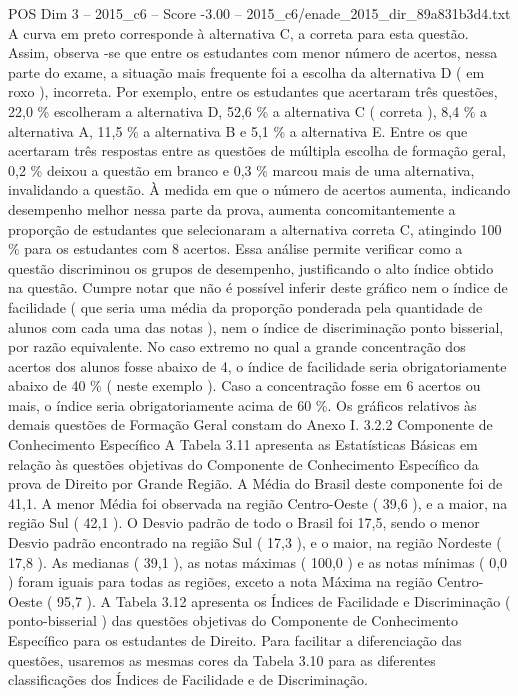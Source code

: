 \begin{textsample}{POS Dim 3 – 2015\_c6 – Score -3.00 – 2015\_c6/enade\_2015\_dir\_89a831b3d4.txt}
A curva em preto corresponde à alternativa C, a correta para esta questão.
Assim, observa -se que entre os estudantes com menor número de acertos, nessa parte do exame, a situação mais frequente foi a escolha da alternativa D ( em roxo ), incorreta.
Por exemplo, entre os estudantes que acertaram três questões, 22,0 \% escolheram a alternativa D, 52,6 \% a alternativa C ( correta ), 8,4 \% a alternativa A, 11,5 \% a alternativa B e 5,1 \% a alternativa E.
Entre os que acertaram três respostas entre as questões de múltipla escolha de formação geral, 0,2 \% deixou a questão em branco e 0,3 \% marcou mais de uma alternativa, invalidando a questão.
À medida em que o número de acertos aumenta, indicando desempenho melhor nessa parte da prova, aumenta concomitantemente a proporção de estudantes que selecionaram a alternativa correta C, atingindo 100 \% para os estudantes com 8 acertos.
Essa análise permite verificar como a questão discriminou os grupos de desempenho, justificando o alto índice obtido na questão.
Cumpre notar que não é possível inferir deste gráfico nem o índice de facilidade ( que seria uma média da proporção ponderada pela quantidade de alunos com cada uma das notas ), nem o índice de discriminação ponto bisserial, por razão equivalente.
No caso extremo no qual a grande concentração dos acertos dos alunos fosse abaixo de 4, o índice de facilidade seria obrigatoriamente abaixo de 40 \% ( neste exemplo ).
Caso a concentração fosse em 6 acertos ou mais, o índice seria obrigatoriamente acima de 60 \%.
Os gráficos relativos às demais questões de Formação Geral constam do Anexo I. 3.2.2 Componente de Conhecimento Específico A Tabela 3.11 apresenta as Estatísticas Básicas em relação às questões objetivas do Componente de Conhecimento Específico da prova de Direito por Grande Região.
A Média do Brasil deste componente foi de 41,1.
A menor Média foi observada na região Centro-Oeste ( 39,6 ), e a maior, na região Sul ( 42,1 ).
O Desvio padrão de todo o Brasil foi 17,5, sendo o menor Desvio padrão encontrado na região Sul ( 17,3 ), e o maior, na região Nordeste ( 17,8 ).
As medianas ( 39,1 ), as notas máximas ( 100,0 ) e as notas mínimas ( 0,0 ) foram iguais para todas as regiões, exceto a nota Máxima na região Centro-Oeste ( 95,7 ).
A Tabela 3.12 apresenta os Índices de Facilidade e Discriminação ( ponto-bisserial ) das questões objetivas do Componente de Conhecimento Específico para os estudantes de Direito.
Para facilitar a diferenciação das questões, usaremos as mesmas cores da Tabela 3.10 para as diferentes classificações dos Índices de Facilidade e de Discriminação.

\end{textsample}
